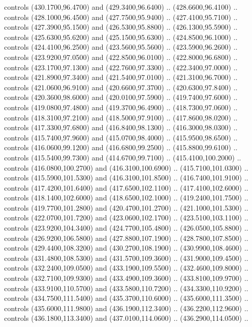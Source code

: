 {\begin{scope}[y=0.80pt, x=0.80pt, yscale=-1, xscale=1, inner sep=0pt, outer sep=0pt, #1]
      controls (430.1700,96.4700) and (429.3400,96.6400) .. (428.6600,96.4100) ..
      controls (428.1000,96.4500) and (427.7500,95.9400) .. (427.4100,95.7100) ..
      controls (427.3900,95.1500) and (426.5300,95.8800) .. (426.1300,95.5900) ..
      controls (425.6300,95.6200) and (425.1500,95.6300) .. (424.8500,96.1000) ..
      controls (424.4100,96.2500) and (423.5600,95.5600) .. (423.5900,96.2600) ..
      controls (423.9200,97.0500) and (422.8500,96.0100) .. (422.8000,96.6800) ..
      controls (423.1700,97.1300) and (422.7600,97.3300) .. (422.3400,97.0000) ..
      controls (421.8900,97.3400) and (421.5400,97.0100) .. (421.3100,96.7000) ..
      controls (421.0600,96.9100) and (420.6600,97.3700) .. (420.6300,97.8400) ..
      controls (420.3600,98.6000) and (420.0100,97.5900) .. (419.7400,97.6000) ..
      controls (419.0800,97.4800) and (419.3700,96.4900) .. (418.7300,97.0600) ..
      controls (418.3100,97.2100) and (418.5000,97.9100) .. (417.8600,98.0200) ..
      controls (417.3300,97.6800) and (416.8400,98.1300) .. (416.3000,98.0300) ..
      controls (415.7400,97.9600) and (415.0700,98.4000) .. (415.9500,98.6500) ..
      controls (416.0600,99.1200) and (416.6800,99.2500) .. (415.8800,99.6100) ..
      controls (415.5400,99.7300) and (414.6700,99.7100) .. (415.4100,100.2000) ..
      controls (416.0800,100.2700) and (416.3100,100.6900) .. (415.7100,101.0300) ..
      controls (415.5900,101.5300) and (416.3100,101.8500) .. (416.7400,101.9100) ..
      controls (417.4200,101.6400) and (417.6500,102.1100) .. (417.4100,102.6000) ..
      controls (418.1400,102.6000) and (418.6500,102.1000) .. (419.2400,101.7500) ..
      controls (419.7700,101.2800) and (420.4700,101.2700) .. (421.1000,101.5300) ..
      controls (422.0700,101.7200) and (423.0600,102.1700) .. (423.5100,103.1100) ..
      controls (423.9200,104.3400) and (424.7700,105.4800) .. (426.0500,105.8800) ..
      controls (426.9200,106.5800) and (427.8800,107.1900) .. (428.7800,107.8500) ..
      controls (429.4400,108.3200) and (430.2700,108.1900) .. (430.9900,108.4600) ..
      controls (431.4800,108.5300) and (431.5700,109.3600) .. (431.9000,109.4500) ..
      controls (432.2400,109.0500) and (433.1900,109.5500) .. (432.4600,109.8000) ..
      controls (432.7100,109.9300) and (433.4900,109.3600) .. (433.8100,109.9700) ..
      controls (433.9100,110.5700) and (433.5800,110.7200) .. (434.3300,110.9200) ..
      controls (434.7500,111.5400) and (435.3700,110.6000) .. (435.6000,111.3500) ..
      controls (435.6000,111.9800) and (436.1900,112.3400) .. (436.2200,112.9600) ..
      controls (436.1800,113.3400) and (437.0100,114.0600) .. (436.2900,114.0500) ..

\end{scope}}
